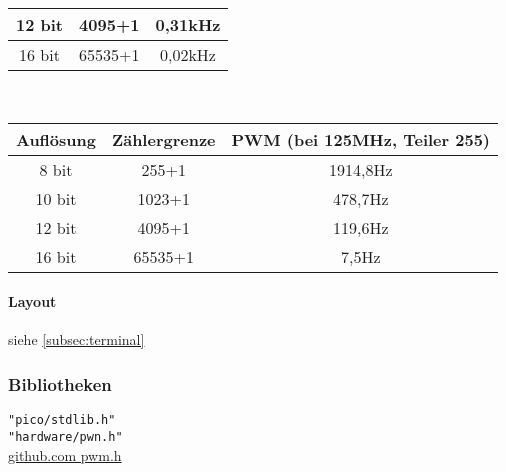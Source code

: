 \documentclass[a4paper,12pt,twoside]{article}
\begin{document}
\begin{center}
\begin{tabular}{|c|c|c|}
		\hline
		12 bit    & 4095+1       & 0,31kHz                               \\
		\hline
		16 bit    & 65535+1      & 0,02kHz                               \\
		\hline
	\end{tabular}
	\\[10mm]
	\begin{tabular}{|c|c|c|}
		\hline
		Auflösung & Zählergrenze & PWM (bei 125MHz, \textbf{Teiler 255}) \\
		\hline
		\hline
		8 bit     & 255+1        & 1914,8Hz                              \\
		\hline
		10 bit    & 1023+1       & 478,7Hz                               \\
		\hline
		12 bit    & 4095+1       & 119,6Hz                               \\
		\hline
		16 bit    & 65535+1      & 7,5Hz                                 \\
		\hline
	\end{tabular}
\end{center}
\paragraph{Layout}
siehe \ref{subsec:terminal}
\subsubsection{Bibliotheken}
\verb|"pico/stdlib.h"| \\
\verb|"hardware/pwn.h"| \\
\small \href{https://github.com/raspberrypi/pico-sdk/blob/master/src/rp2_common/hardware_pwm/include/hardware/pwm.h}{github.com pwm.h}
\end{document}
